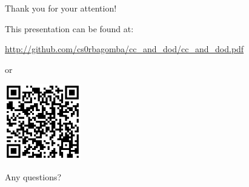 \documentclass{beamer}
\begin{document}
\begin{frame}{Thank you for your attention!}

\begin{center}

This presentation can be found at: 

\small
\url{http://github.com/cs0rbagomba/cc_and_dod/cc_and_dod.pdf}

\smallskip 
or
\smallskip

\includegraphics[height=3.3cm]{qr_cc_and_dod.png}

\smallskip

Any questions?
\end{center}


\end{frame}

\end{document}

